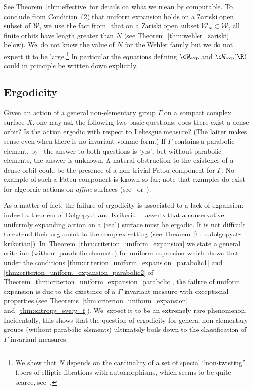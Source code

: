 See Theorem~\ref{thm:effective} for details on what we mean by computable. To conclude
from Condition~(2) that uniform
expansion holds on a Zariski open subset of $\mathcal W$, we~use the fact from~\cite{finite_orbits}
that on a Zariski open subset $\mathcal W_N\subset \mathcal W$, all finite orbits have length
greater than $N$ (see Theorem~\ref{thm:wehler_zariski} below). We~do not know the value of $N$ for the Wehler family but we do not expect it to be large.\footnote{We show that $N$ depends on the cardinality of a set of special ``non-twisting'' fibers of elliptic fibrations with automorphisms, which seems to be quite scarce, see~\cite[Rem.\,7.7.14]{duistermaat}.}
In particular the equations defining $ \cW_{\mathrm{exp}}$ and $ \cW_{\mathrm{exp}}(\R)$
could in principle be written down explicitly.

\subsection{Ergodicity} \label{subs:intro_ergodicity}
Given an action of a general non-elementary group $\Gamma$ on a compact complex surface $X$,
one may ask the following two basic questions:
does there exist a dense orbit? Is the action ergodic with respect to Lebesgue measure?
(The latter makes sense even when there is no invariant volume form.)
If $\Gamma$ contains a parabolic element, by~\cite{invariant} the answer to both questions is `yes',
but without parabolic elements, the answer is unknown.
A natural obstruction to the existence of
a dense orbit could be the presence of a non-trivial Fatou
component for $\Gamma$. No example of such a Fatou component is known so far;
note that examples do exist for algebraic actions on \emph{affine} surfaces
(see~\cite[\S 4.1]{Cantat:BHPS} or~\cite[Th.\,E]{rebelo-roeder}).

As a matter of fact, the failure of ergodicity is
associated to a lack of expansion: indeed a
theorem of Dolgopyat and Krikorian~\cite[\S 10]{dolgopyat-krikorian}
asserts that a conservative uniformly expanding action on a (real) surface must be ergodic. It is not difficult
to extend their argument to the complex setting (see Theorem~\ref{thm:dolgopyat-krikorian}). In~Theorem~\ref{thm:criterion_uniform_expansion} we state
a general criterion (\ie without parabolic elements) for uniform expansion
which shows that under the conditions \eqref{thm:criterion_uniform_expansion_parabolic1} and \eqref{thm:criterion_uniform_expansion_parabolic2} of
Theorem~\ref{thm:criterion_uniform_expansion_parabolic},
the failure of uniform expansion is due to the existence of a
$\Gamma$-invariant measure with exceptional properties (see Theorems~\ref{thm:criterion_uniform_expansion} and~\ref{thm:entropy_every_f}). We~expect it to be an extremely rare phenomenon.
Incidentally,
this shows that the question of ergodicity for general non-elementary groups (\ie without parabolic elements)
ultimately boils down to the
classification of $\Gamma$-invariant measures.

